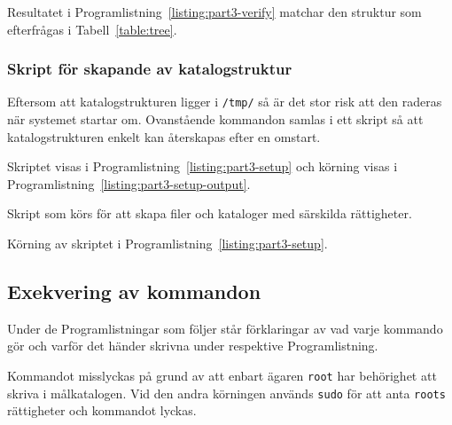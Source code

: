 Resultatet i Programlistning~\ref{listing:part3-verify} matchar den
struktur som efterfrågas i Tabell~\ref{table:tree}.


\subsubsection{Skript för skapande av katalogstruktur}
Eftersom att katalogstrukturen ligger i \texttt{/tmp/} så är det stor risk att
den raderas när systemet startar om. Ovanstående kommandon samlas i ett skript
så att katalogstrukturen enkelt kan återskapas efter en omstart.

Skriptet visas i Programlistning~\ref{listing:part3-setup} och körning visas i
Programlistning~\ref{listing:part3-setup-output}.

\begin{listing}[H]
\caption{Skript som körs för att skapa filer och kataloger med särskilda rättigheter.}
\label{listing:part3-setup}
\end{listing}

\begin{listing}[H]
\caption{Körning av skriptet i Programlistning~\ref{listing:part3-setup}.}
\label{listing:part3-setup-output}
\end{listing}


\subsection{Exekvering av kommandon}
%
%

\newcommand{\explainedcmd}[4]{
\begin{listing}[H]
\shellcode[firstline={#1},lastline={#2}]{tex/part3-commands}
\caption{#3}
\label{listing:ntp-conf-mod}
\end{listing}
}

Under de Programlistningar som följer står förklaringar av vad varje kommando
gör och varför det händer skrivna under respektive Programlistning.

             {Kommandot misslyckas på grund av att enbart ägaren \texttt{root}
              har behörighet att skriva i målkatalogen.  
              Vid den andra körningen används \texttt{sudo} för att anta 
              \texttt{roots} rättigheter och kommandot lyckas.}

